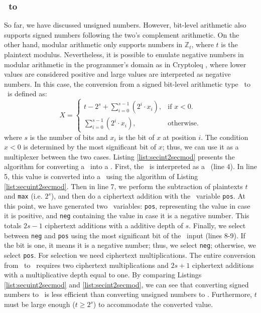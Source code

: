 \subsubsection{\secint\ to \secmod{}}\label{sss:secint2secmod}

So far, we have discussed unsigned numbers. However, bit-level arithmetic also supports signed numbers following the two's complement arithmetic.
On the other hand, modular arithmetic only supports numbers in $\mathbb{Z}_t$, where $t$ is the plaintext modulus.
Nevertheless, it is possible to emulate negative numbers in modular arithmetic in the programmer's domain as in Cryptoleq \cite{cryptoleq}, where lower values are considered positive and large values are interpreted as negative numbers.
In this case, the conversion from a signed bit-level arithmetic type \secint\ to \secmod\ is defined as:
\begin{equation}
  X=\begin{cases}
    t - 2^s + \sum_{i=0}^{s-1}{(2^i \cdot x_i)}, & \text{if $x<0$}.\\
    \sum_{i=0}^{s-1}{(2^i \cdot x_i)}, & \text{otherwise}.
  \end{cases}
\end{equation}
where $s$ is the number of bits and $x_i$ is the bit of $x$ at position $i$. The condition $x < 0$ is determined by the most significant bit of $x$; thus, we can use it as a multiplexer between the two cases.
Listing \ref{list:secint2secmod} presents the algorithm for converting a \secint\ into a \secmod. First, the \secint\ is interpreted as a \secuint\ (line 4). In line 5, this value is converted into a \secmod\ using the algorithm of Listing \ref{list:secuint2secmod}.
Then in line 7, we perform the subtraction of plaintexts $t$ and \texttt{max} (i.e. $2^s$), and then do a ciphertext addition with the \secmod\ variable \texttt{pos}. At this point, we have generated two \secmod\ variables: \texttt{pos}, representing the value in case it is positive, and \texttt{neg} containing the value in case it is a negative number. This totals $2s - 1$ ciphertext additions with a additive depth of $s$.
Finally, we select between \texttt{neg} and \texttt{pos} using the most significant bit of the \secint\ input (lines 8-9). If the bit is one, it means it is a negative number; thus, we select \texttt{neg}; otherwise, we select \texttt{pos}.
For selection we need ciphertext multiplications.
The entire conversion from \secint\ to \secmod\ requires two ciphertext multiplications and $2s + 1$ ciphertext additions with a multiplicative depth equal to one.
By comparing Listings \ref{list:secuint2secmod} and \ref{list:secint2secmod}, we can see that converting signed numbers to \secmod\ is less efficient than converting unsigned numbers to \secmod. Furthermore, $t$ must be large enough ($t \geq 2^s$) to accommodate the converted value.

